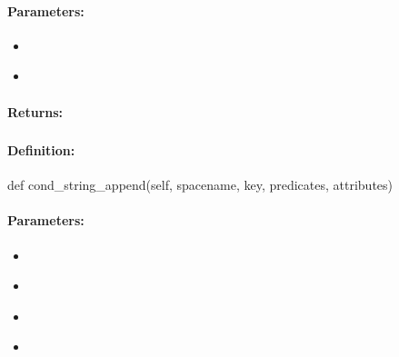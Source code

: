 \paragraph{Parameters:}
\begin{itemize}[noitemsep]
\item {}\\

\item {}\\

\end{itemize}

\paragraph{Returns:}


\pagebreak
\subsubsection{}
\label{api:python:cond_string_append}


\paragraph{Definition:}
\begin{pythoncode}
def cond_string_append(self, spacename, key, predicates, attributes)
\end{pythoncode}

\paragraph{Parameters:}
\begin{itemize}[noitemsep]
\item {}\\

\item {}\\

\item {}\\

\item {}\\

\end{itemize}

